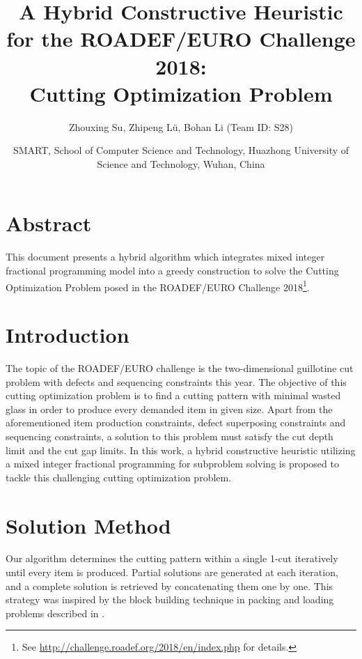 \documentclass{article}
\begin{document}
	\title{
		\textbf{A Hybrid Constructive Heuristic for the ROADEF/EURO Challenge 2018:\\Cutting Optimization Problem}
	}
	\author{
		Zhouxing Su, Zhipeng L\"u, Bohan Li \quad (Team ID: S28)
	}
	\date{
		SMART, School of Computer Science and Technology, Huazhong University of Science and Technology, Wuhan, China
	}
	\maketitle
	
	
	\section*{Abstract}
		
		This document presents a hybrid algorithm which integrates mixed integer fractional programming model into a greedy construction to solve the Cutting Optimization Problem posed in the ROADEF/EURO Challenge 2018\footnote{See \url{http://challenge.roadef.org/2018/en/index.php} for details.}.
	
	\section{Introduction}
		
		The topic of the ROADEF/EURO challenge is the two-dimensional guillotine cut problem with defects and sequencing constraints this year.
		The objective of this cutting optimization problem is to find a cutting pattern with minimal wasted glass in order to produce every demanded item in given size.
		Apart from the aforementioned item production constraints, defect superposing constraints and sequencing constraints, a solution to this problem must satisfy the cut depth limit and the cut gap limits.
		In this work, a hybrid constructive heuristic utilizing a mixed integer fractional programming for subproblem solving is proposed to tackle this challenging cutting optimization problem.
	
	\section{Solution Method}
	
		Our algorithm determines the cutting pattern within a single 1-cut iteratively until every item is produced.
		Partial solutions are generated at each iteration, and a complete solution is retrieved by concatenating them one by one.
		This strategy was inspired by the block building technique in packing and loading problems described in \cite{fanslau2010tree}.
		
\end{document}
